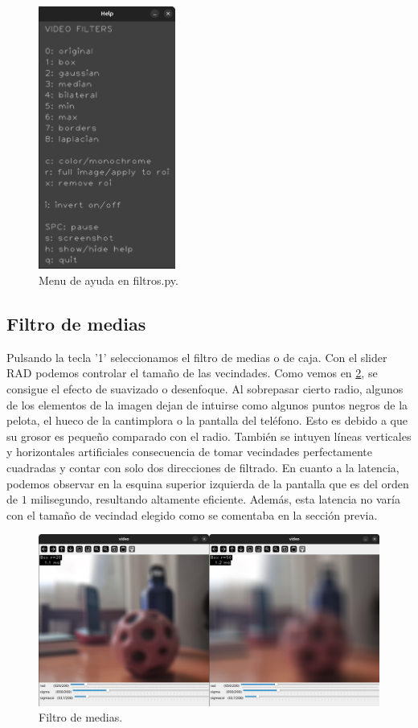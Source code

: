 \documentclass[12pt]{article}
\begin{document}
\begin{figure}[H]
    \centering
    \includegraphics[width=0.4\textwidth]{images_filtros/Menu_ayuda.png} 
    \caption{Menu de ayuda en filtros.py.}
    \label{fig:menu_ayuda}
\end{figure}

\subsection{Filtro de medias}
Pulsando la tecla '1' seleccionamos el filtro de medias o de caja. 
Con el slider RAD podemos controlar el tamaño de las vecindades. 
Como vemos en \ref{fig:box_filter}, se consigue el efecto de suavizado o desenfoque. 
Al sobrepasar cierto radio, algunos de los elementos de la imagen dejan de intuirse como algunos puntos negros de la pelota, el hueco de la cantimplora o la pantalla del teléfono.
Esto es debido a que su grosor es pequeño comparado con el radio. También se intuyen líneas verticales y horizontales artificiales consecuencia de tomar vecindades perfectamente cuadradas y contar con solo dos direcciones de filtrado. 
En cuanto a la latencia, podemos observar en la esquina superior izquierda de la pantalla que es del orden de $1$ milisegundo, resultando altamente eficiente. Además, esta latencia no varía con el tamaño de vecindad elegido como se comentaba en la sección previa.
\begin{figure}[H]
    \centering
    \includegraphics[width=1.0\textwidth]{images_filtros/box_filter.png} 
    \caption{Filtro de medias.}
    \label{fig:box_filter}
\end{figure}
\end{document}

